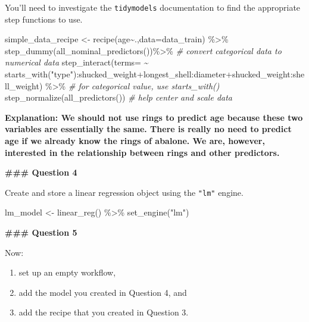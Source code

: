 \documentclass[
]{article}
\newenvironment{Shaded}{\begin{snugshade}}{\end{snugshade}}
\newcommand{\AttributeTok}[1]{\textcolor[rgb]{0.77,0.63,0.00}{#1}}
\newcommand{\CommentTok}[1]{\textcolor[rgb]{0.56,0.35,0.01}{\textit{#1}}}
\newcommand{\FunctionTok}[1]{\textcolor[rgb]{0.00,0.00,0.00}{#1}}
\newcommand{\NormalTok}[1]{#1}
\newcommand{\OtherTok}[1]{\textcolor[rgb]{0.56,0.35,0.01}{#1}}
\newcommand{\SpecialCharTok}[1]{\textcolor[rgb]{0.00,0.00,0.00}{#1}}
\newcommand{\StringTok}[1]{\textcolor[rgb]{0.31,0.60,0.02}{#1}}
\providecommand{\tightlist}{%
  \setlength{\itemsep}{0pt}\setlength{\parskip}{0pt}}
\begin{document}
You'll need to investigate the \texttt{tidymodels} documentation to find
the appropriate step functions to use.

\begin{Shaded}
\begin{Highlighting}[]
\NormalTok{simple\_data\_recipe }\OtherTok{\textless{}{-}}
  \FunctionTok{recipe}\NormalTok{(age}\SpecialCharTok{\textasciitilde{}}\NormalTok{.,}\AttributeTok{data=}\NormalTok{data\_train) }\SpecialCharTok{\%\textgreater{}\%}
  \FunctionTok{step\_dummy}\NormalTok{(}\FunctionTok{all\_nominal\_predictors}\NormalTok{())}\SpecialCharTok{\%\textgreater{}\%} \CommentTok{\# convert categorical data to numerical data}
  \FunctionTok{step\_interact}\NormalTok{(}\AttributeTok{terms=} \SpecialCharTok{\textasciitilde{}} \FunctionTok{starts\_with}\NormalTok{(}\StringTok{"type"}\NormalTok{)}\SpecialCharTok{:}\NormalTok{shucked\_weight}\SpecialCharTok{+}\NormalTok{longest\_shell}\SpecialCharTok{:}\NormalTok{diameter}\SpecialCharTok{+}\NormalTok{shucked\_weight}\SpecialCharTok{:}\NormalTok{shell\_weight) }\SpecialCharTok{\%\textgreater{}\%} \CommentTok{\# for categorical value, use starts\_with()}
  \FunctionTok{step\_normalize}\NormalTok{(}\FunctionTok{all\_predictors}\NormalTok{()) }\CommentTok{\# help center and scale data}
\end{Highlighting}
\end{Shaded}

\textbf{Explanation: We should not use rings to predict age because
these two variables are essentially the same. There is really no need to
predict age if we already know the rings of abalone. We are, however,
interested in the relationship between rings and other predictors.}

\textbf{\#\#\# Question 4}

Create and store a linear regression object using the \texttt{"lm"}
engine.

\begin{Shaded}
\begin{Highlighting}[]
\NormalTok{lm\_model }\OtherTok{\textless{}{-}} \FunctionTok{linear\_reg}\NormalTok{() }\SpecialCharTok{\%\textgreater{}\%} 
  \FunctionTok{set\_engine}\NormalTok{(}\StringTok{"lm"}\NormalTok{)}
\end{Highlighting}
\end{Shaded}

\textbf{\#\#\# Question 5}

Now:

\begin{enumerate}
\def\labelenumi{\arabic{enumi}.}
\tightlist
\item
  set up an empty workflow,
\item
  add the model you created in Question 4, and
\item
  add the recipe that you created in Question 3.
\end{enumerate}
\end{document}
